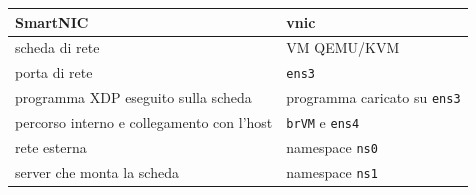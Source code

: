 \begin{tabular}{@{}ll@{}}
    \toprule
    \textbf{SmartNIC} & \textbf{vnic} \\
    \midrule
    scheda di rete & VM QEMU/KVM \\
    porta di rete & \texttt{ens3} \\
    programma XDP eseguito sulla scheda & programma caricato su \texttt{ens3} \\
    percorso interno e collegamento con l'host & \texttt{brVM} e \texttt{ens4} \\
    rete esterna & namespace \texttt{ns0} \\
    server che monta la scheda & namespace \texttt{ns1} \\
    \bottomrule
\end{tabular}